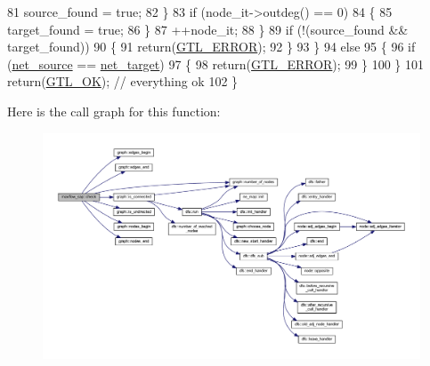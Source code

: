 \begin{DoxyCode}
81                 source\_found = \textcolor{keyword}{true};
82             \}
83             \textcolor{keywordflow}{if} (node\_it->outdeg() == 0)
84             \{
85                 target\_found = \textcolor{keyword}{true};
86             \}
87             ++node\_it;
88         \}
89         \textcolor{keywordflow}{if} (!(source\_found && target\_found))
90         \{
91             \textcolor{keywordflow}{return}(\mbox{\hyperlink{classalgorithm_af1a0078e153aa99c24f9bdf0d97f6710a6fcf574690bbd6cf710837a169510dd7}{GTL\_ERROR}});
92         \}
93     \}
94     \textcolor{keywordflow}{else}
95     \{
96         \textcolor{keywordflow}{if} (\mbox{\hyperlink{classmaxflow__sap_abd4266c76dbd73f7f719d3a4fba2655d}{net\_source}} == \mbox{\hyperlink{classmaxflow__sap_a8d0e8f448ed29a1329a70c8f4f496c2c}{net\_target}})
97         \{
98             \textcolor{keywordflow}{return}(\mbox{\hyperlink{classalgorithm_af1a0078e153aa99c24f9bdf0d97f6710a6fcf574690bbd6cf710837a169510dd7}{GTL\_ERROR}});
99         \}
100     \}
101     \textcolor{keywordflow}{return}(\mbox{\hyperlink{classalgorithm_af1a0078e153aa99c24f9bdf0d97f6710a5114c20e4a96a76b5de9f28bf15e282b}{GTL\_OK}});   \textcolor{comment}{// everything ok}
102 \}
\end{DoxyCode}
Here is the call graph for this function\+:\nopagebreak
\begin{figure}[H]
\begin{center}
\leavevmode
\includegraphics[width=350pt]{classmaxflow__sap_aa2974bf25fb597677848fdb23c12d338_cgraph}
\end{center}
\end{figure}
\mbox{\label{classmaxflow__sap_ab9a8d9e4e32a8eb6390c0d2fb3cb9596}} 
